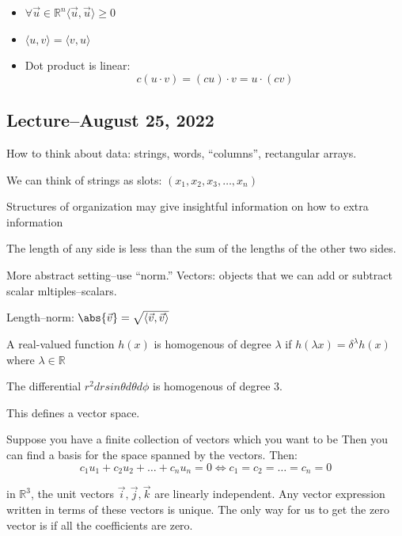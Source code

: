 \documentclass{scrreprt}
\begin{document}
\begin{itemize}
	\item $\forall \vec{u}\in \mathbb{R}^n \langle \vec{u}, \vec{u}\rangle \geq 0$
	\item $\langle u, v \rangle = \langle v, u \rangle$
	\item Dot product is linear: \[
		      c(u\cdot v) = (cu)\cdot v = u\cdot (cv)
	      \]
\end{itemize}

\subsection{Lecture--August 25, 2022}

How to think about data: strings, words, ``columns'', rectangular arrays.

We can think of strings as slots: $(x_1, x_2, x_3, \ldots, x_n)$

Structures of organization may give insightful information on how to extra information

\begin{definition}
	The length of any side is less than the sum of the lengths of the other two sides.
\end{definition}

More abstract setting--use ``norm.'' Vectors: objects that we can add or subtract scalar mltiples--scalars.

Length--norm: $\abs{\vec{v}}=\sqrt{\langle \vec{v}, \vec{v}\rangle}$

\begin{definition}[Homogenous]
	A real-valued function $h(x)$ is homogenous of degree $\lambda$
	if $h(\lambda x)=\delta^\lambda h(x)$ where $\lambda \in \mathbb{R}$

	The differential $r^2drsin\theta d\theta d\phi$ is homogenous of degree $3$.

	This defines a vector space.
\end{definition}

\begin{remark}
	Suppose you have a finite collection of vectors which you want to be 
	Then you can find a basis for the space spanned by the vectors. Then:
	\[
		c_1u_1 + c_2u_2 + \ldots + c_nu_n = 0 \Leftrightarrow c_1=c_2=\ldots=c_n=0
	\]

	in $\mathbb{R}^3$, the unit vectors $\vec{i}, \vec{j}, \vec{k}$ are linearly independent.
	Any vector expression written in terms of these vectors is unique. The only way
	for us to get the zero vector is if all the coefficients are zero.

\end{remark}
\end{document}
